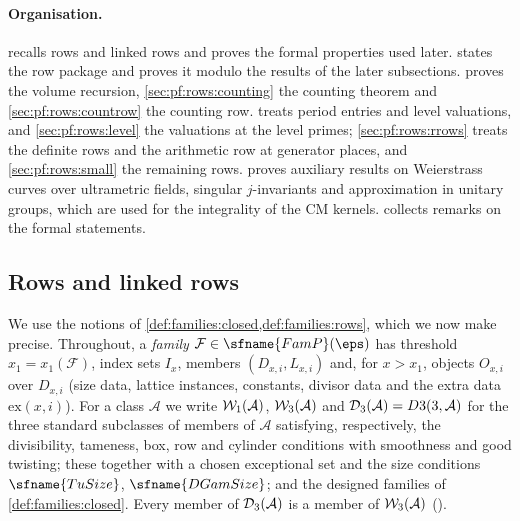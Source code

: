 \paragraph{Organisation.}
 recalls rows and linked rows and proves the formal properties used later.
 states the row package and proves it modulo the results of the later subsections.
 proves the volume recursion, \cref{sec:pf:rows:counting} the counting theorem and
\cref{sec:pf:rows:countrow} the counting row.  treats period entries and level
valuations, and \cref{sec:pf:rows:level} the valuations at the level primes; \cref{sec:pf:rows:rrows} treats the definite rows
and the arithmetic row at generator places, and \cref{sec:pf:rows:small} the remaining rows.  proves
auxiliary results on Weierstrass curves over ultrametric fields, singular $j$-invariants and approximation in unitary groups,
which are used for the integrality of the CM kernels.  collects remarks on the formal statements.

\subsection{Rows and linked rows}\label{sec:pf:rows:framework}

We use the notions of \cref{def:families:closed,def:families:rows}, which we now make precise. Throughout, a
\emph{family} $\mathcal F\in\sfname{FamP}(\eps)$ has threshold $x_1=x_1(\mathcal F)$, index sets $I_x$, members
$(D_{x,i},L_{x,i})$ and, for $x>x_1$, objects $O_{x,i}$ over $D_{x,i}$ (size data, lattice instances, constants,
divisor data and the extra data $\mathrm{ex}(x,i)$). For a class $\mathcal A$ we write $\mathcal{W}_1(\mathcal A)$,
$\mathcal{W}_3(\mathcal A)$ and $\mathcal{D}_3(\mathcal A)=D3(3,\mathcal A)$ for the three standard subclasses of members of
$\mathcal A$ satisfying, respectively, the divisibility, tameness, box, row and cylinder conditions with smoothness
and good twisting; these together with a chosen exceptional set and the size conditions $\sfname{TuSize}$,
$\sfname{DGamSize}$; and the designed families of \cref{def:families:closed}. Every member of $\mathcal{D}_3(\mathcal A)$ is a member of
$\mathcal{W}_3(\mathcal A)$ ().

